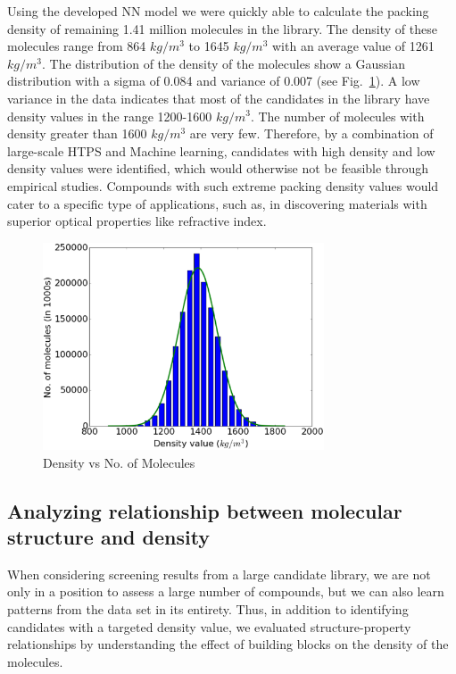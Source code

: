 Using the developed NN model we were quickly able to calculate the packing density of remaining 1.41 million molecules in the library. The density of these molecules range from 864 $kg/m^3$ to 1645 $kg/m^3$ with an average value of 1261 $kg/m^3$. The distribution of the density of the molecules show a Gaussian distribution with a sigma of 0.084 and variance of 0.007 (see Fig.\ \ref{fig:den_hist}). A low variance in the data indicates that most of the candidates in the library have density values in the range 1200-1600 $kg/m^3$. The number of molecules with density greater than 1600 $kg/m^3$ are very few. Therefore, by a combination of large-scale HTPS and Machine learning, candidates with high density and low density values were identified, which would otherwise not be feasible through empirical studies. Compounds with such extreme packing density values would cater to a specific type of applications, such as, in discovering materials with superior optical properties like refractive index. %

\begin{figure}[htbp] 
	\centering
	\includegraphics[width=0.744\textwidth]{Chapter-6/Figures/hist.eps}
	\caption{Density vs No. of Molecules} 
	\label{fig:den_hist} 
\end{figure} 

\subsection{Analyzing relationship between molecular structure and density}
\label{subsec:spr}

When considering screening results from a large candidate library, we are not only in a position to assess a large number of compounds, but we can also learn patterns from the data set in its entirety. Thus, in addition to identifying candidates with a targeted density value, we evaluated structure-property relationships by understanding the effect of building blocks on the density of the molecules.


